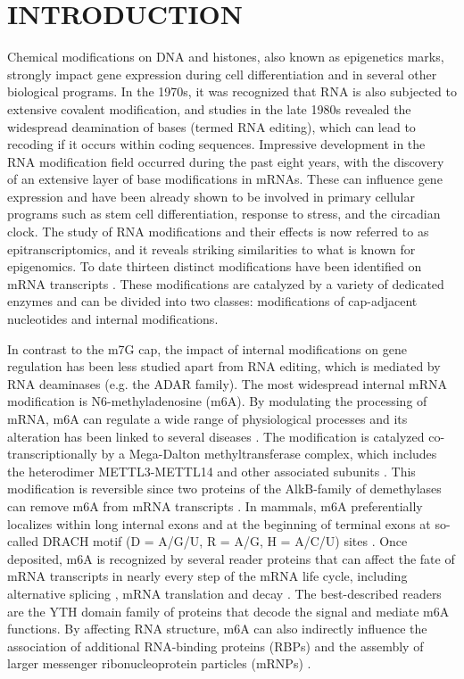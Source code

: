 \documentclass[times, 11pt, a4paper]{article}
\begin{document}
\section*{INTRODUCTION}
Chemical modifications on DNA and histones, also known as epigenetics marks, strongly impact gene expression during cell differentiation and in several other biological programs. In the 1970s, it was recognized that RNA is also subjected to extensive covalent modification, and studies in the late 1980s revealed the widespread deamination of bases (termed RNA editing), which can lead to recoding if it occurs within coding sequences. Impressive development in the RNA modification field occurred during the past eight years, with the discovery of an extensive layer of base modifications in mRNAs. These can influence gene expression and have been already shown to be involved in primary cellular programs such as stem cell differentiation, response to stress, and the circadian clock. The study of RNA modifications and their effects is now referred to as epitranscriptomics, and it reveals striking similarities to what is known for epigenomics.
To date thirteen distinct modifications have been identified on mRNA transcripts \citep{Anreiter2021}. These modifications are catalyzed by a variety of dedicated enzymes and can be divided into two classes: modifications of cap-adjacent nucleotides and internal modifications. 

In contrast to the m7G cap, the impact of internal modifications on gene regulation has been less studied apart from RNA editing, which is mediated by RNA deaminases (e.g. the ADAR family). The most widespread internal mRNA modification is N6-methyladenosine (m6A). By modulating the processing of mRNA, m6A can regulate a wide range of physiological processes and its alteration has been linked to several diseases \cite{Roignant2017,Zaccara2019,Shi2019}. The modification is catalyzed co-transcriptionally by a Mega-Dalton methyltransferase complex, which includes the heterodimer METTL3-METTL14 and other associated subunits \cite{GarciasMorales2021}. This modification is reversible since two proteins of the AlkB-family of demethylases can remove m6A from mRNA transcripts \citep{Jia2011,Zheng2013}. In mammals, m6A preferentially localizes within long internal exons and at the beginning of terminal exons at so-called DRACH motif (D = A/G/U, R = A/G, H = A/C/U) sites \citep{Dominissini2012,Meyer2012,Ke2015}. Once deposited, m6A is recognized by several reader proteins that can affect the fate of mRNA transcripts in nearly every step of the mRNA life cycle, including alternative splicing \citep{Adhikari2016,Roundtree2017}, mRNA translation \citep{wang2015n6} and decay \citep{wang2014n,du2016ythdf2,Roundtree2017}. The best-described readers are the YTH domain family of proteins that decode the signal and mediate m6A functions. By affecting RNA structure, m6A can also indirectly influence the association of additional RNA-binding proteins (RBPs) and the assembly of larger messenger ribonucleoprotein particles (mRNPs) \citep{patil2018reading}.
\end{document}
